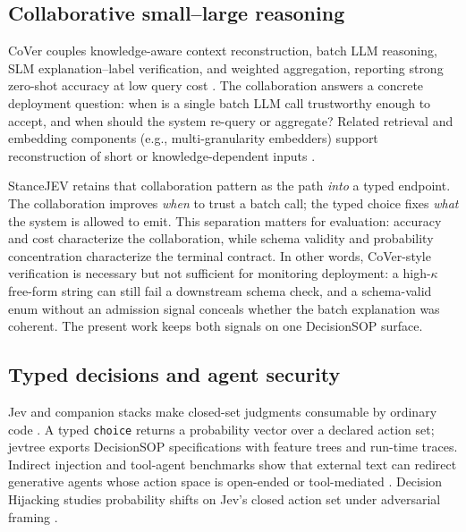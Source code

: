 \documentclass[10pt]{article}
\theoremstyle{definition}
\begin{document}
\subsection{Collaborative small--large reasoning}
CoVer couples knowledge-aware context reconstruction, batch LLM reasoning, SLM explanation--label
verification, and weighted aggregation, reporting strong zero-shot accuracy at low query cost
\cite{yan2025cover}.
The collaboration answers a concrete deployment question: when is a single batch LLM call trustworthy enough
to accept, and when should the system re-query or aggregate?
Related retrieval and embedding components (e.g., multi-granularity embedders) support reconstruction of short
or knowledge-dependent inputs \cite{chen2024bgem3}.

StanceJEV retains that collaboration pattern as the path \emph{into} a typed endpoint.
The collaboration improves \emph{when} to trust a batch call; the typed choice fixes \emph{what} the system is
allowed to emit.
This separation matters for evaluation: accuracy and cost characterize the collaboration, while schema
validity and probability concentration characterize the terminal contract.
In other words, CoVer-style verification is necessary but not sufficient for monitoring deployment: a
high-$\kappa$ free-form string can still fail a downstream schema check, and a schema-valid enum without an
admission signal conceals whether the batch explanation was coherent.
The present work keeps both signals on one DecisionSOP surface.

\subsection{Typed decisions and agent security}
Jev and companion stacks make closed-set judgments consumable by ordinary code
\cite{typesafe2026systemone,typesafe2026jev,jevtree2026,jevforest2026}.
A typed \texttt{choice} returns a probability vector over a declared action set; jevtree exports DecisionSOP
specifications with feature trees and run-time traces.
Indirect injection and tool-agent benchmarks show that external text can redirect generative agents whose
action space is open-ended or tool-mediated
\cite{greshake2023indirect,zhan2024in,yi2025bipia,debenedetti2024agentdojo}.
Decision Hijacking studies probability shifts on Jev's closed action set under adversarial framing
\cite{wu2026decisionhijacking}.
\end{document}
